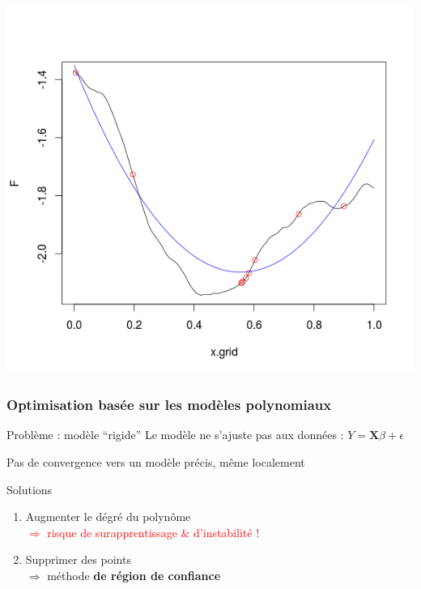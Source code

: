 \documentclass{beamer}
\begin{document}
\begin{frame}
\includegraphics[trim = 10mm 20mm 10mm 10mm, clip, width=.3\paperwidth]{fig/prs7.png}
\end{frame}
\begin{frame}
\frametitle{Optimisation basée sur les modèles polynomiaux}
\begin{block}{Problème : modèle ``rigide''}
Le modèle ne s'ajuste pas aux données : 
$ Y = \mathbf{X} \beta + \epsilon $

Pas de convergence vers un modèle précis, même localement
\end{block}

\begin{exampleblock}{Solutions}
\begin{enumerate}
 \item Augmenter le dégré du polynôme \\
 \textcolor{red}{$\Rightarrow$ risque de surapprentissage \& d'instabilité !}
 \item Supprimer des points \\
 $\Rightarrow$ méthode \textbf{de région de confiance}
\end{enumerate}
\end{exampleblock}
\end{frame}
\end{document}
